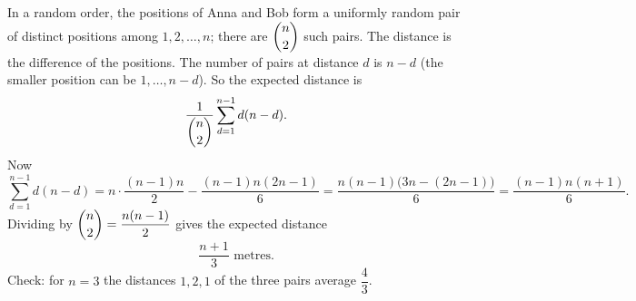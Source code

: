 In a random order, the positions of Anna and Bob form a uniformly random pair of distinct positions among $1,2,\dots,n$; there are $\dbinom n2$ such pairs. The distance is the difference of the positions. The number of pairs at distance $d$ is $n-d$ (the smaller position can be $1,\dots,n-d$). So the expected distance is
\[
\dfrac{1}{\dbinom n2}\sum_{d=1}^{n-1}d(n-d).
\]
Now
\[
\sum_{d=1}^{n-1}d(n-d)=n\cdot\dfrac{(n-1)n}{2}-\dfrac{(n-1)n(2n-1)}{6}=\dfrac{n(n-1)\bigl(3n-(2n-1)\bigr)}{6}=\dfrac{(n-1)n(n+1)}{6}.
\]
Dividing by $\dbinom n2=\dfrac{n(n-1)}{2}$ gives the expected distance
\[
\boxed{\dfrac{n+1}{3}\text{ metres}}.
\]
Check: for $n=3$ the distances $1,2,1$ of the three pairs average $\dfrac{4}{3}$.
